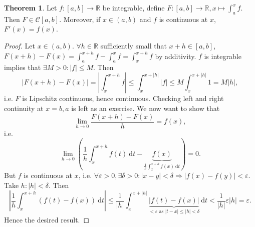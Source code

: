 \documentclass[a4paper]{article}
\theoremstyle{definition}
\newtheorem{thm}[defn]{Theorem}
\begin{document}
\begin{thm}
\label{thm:intiscont}
Let $f:[a,b]\rightarrow \mathbb R$ be integrable, define $F:[a,b]\rightarrow \mathbb R, x\mapsto \int_a^x f$. Then $F\in \mathcal C [a,b]$. Moreover, if $x\in (a,b)$ and $f$ is continuous at $x$, $F'(x)=f(x)$.
\end{thm}
\begin{proof}
Let $x\in (a,b)$. $\forall h\in \mathbb R$ sufficiently small that $x+h\in [a,b]$, $F(x+h)-F(x)=\int_a^{x+h}f-\int_a^x f = \int_x^{x+h} f$ by additivity. $f$ is integrable implies that $\exists M>0: |f|\leq M$. Then
\[
|F(x+h)-F(x)|=\left|\int_x^{x+h}f\right|\leq \int_x^{x+|h|} |f|\leq M\int_x^{x+|h|}1=M|h|,
\]
i.e. $F$ is Lipschitz continuous, hence continuous. Checking left and right continuity at $x=b,a$ is left as an exercise. We now want to show that
\[
\lim_{h\rightarrow 0} \frac{F(x+h)-F(x)}{h}=f(x) ,
\]
i.e.
\[
\lim _{h\rightarrow 0} \left(\frac1h \int_x^{x+h}f(t) \ \mathrm d t - \underbrace{f(x)}_{\frac1h \int_x^{x+h}f(x) \ \mathrm d t}\right)=0 .
\]
But $f$ is continuous at $x$, i.e. $\forall \varepsilon >0, \exists \delta >0:|x-y|<\delta \Rightarrow |f(x)-f(y)|<\varepsilon$. Take $h:|h|<\delta$. Then
\[
\left|\frac{1}{h}\int_x^{x+h} \left(f(t)-f(x)\right) \ \mathrm d t \right|\leq \frac{1}{|h|} \int_x^{x+|h|} \underbrace{|f(t)-f(x)|}_{<\varepsilon \text{ as }|t-x|\leq |h|<\delta} \ \mathrm d t<\frac{1}{|h|}\varepsilon |h|=\varepsilon .
\]
Hence the desired result.
\end{proof}
\end{document}
